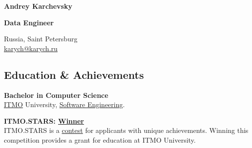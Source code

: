 \documentclass[a4paper,11pt]{article}
\newcommand{\MySkip}{
\vskip10pt
}
\newcommand{\myhref}[2]{%
\href{#1}{\textcolor{ColorTwo}{#2}}
}
\begin{document}
\thispagestyle{empty}

\begin{adjustbox}{valign=t}
\begin{minipage}{0.3\textwidth}

\begin{center}

\MySkip

{\LARGE \bfseries Andrey Karchevsky}
\MySkip
{\Large \bfseries \textcolor{ColorOne}{Data Engineer}}

\MySkip

\faMapPin\hspace{0.2em} Russia, Saint Petersburg \\
\faEnvelope\hspace{0.2em} \myhref{mailto:karych@karych.ru}{karych@karych.ru}

\end{center}

\begin{flushleft}
\section*{Education \& Achievements}
\begin{description}[font=\normalfont\color{ColorOne},leftmargin=0pt,labelwidth=0pt]
	\item[2023--2027] \textbf{Bachelor in Computer Science} \\
	\href{https://itmo.ru/}{ITMO} University, \href{https://fitp.itmo.ru/p/about-fitp/753}{Software Engineering}.
	
	\item[2023] \textbf{ITMO.STARS: \myhref{https://news.itmo.ru/en/education/students/news/13345/}{Winner}} \\
	ITMO.STARS is a \myhref{https://stars.itmo.ru/}{contest} for applicants with unique achievements. Winning this competition provides a grant for education at ITMO University.
\end{description}


\end{flushleft}
\end{minipage}
\end{adjustbox}
\end{document}
